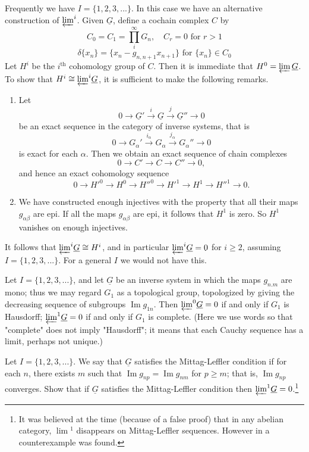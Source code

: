 \documentclass[../main]{subfiles}
\begin{document}
Frequently we have $I=\{1,2,3,...\}$. In this case we have an alternative construction of ${\varprojlim}^i$. Given $\underline{G}$, define a cochain complex $C$ by 
\[C_0=C_1=\prod_i^\infty G_n,\quad C_r=0 \text{ for } r>1 \] 
\[\delta\{x_n\}=\{x_n-g_{n,n+1}x_{n+1}\} \text{ for } \{x_n\}\in C_0\]
Let $H^i$ be the $i^\text{th}$ cohomology group of $C$. Then it is immediate that $H^0=\varprojlim\underline{G}$. To show that $H^i\cong{\varprojlim}^i\underline{G}$, it is sufficient to make the following remarks.
\begin{enumerate}[wide=\parindent]
    \item Let \[0\longrightarrow \underline{G}'\overset{i}{\longrightarrow}\underline{G}\overset{j}{\longrightarrow}\underline{G}''\longrightarrow 0\] be an exact sequence in the category of inverse systems, that is \\ \[0\longrightarrow G_\alpha'\overset{i_\alpha}{\longrightarrow}G_\alpha\overset{j_\alpha}{\longrightarrow}G_\alpha''\longrightarrow 0\] is exact for each $\alpha$. Then we obtain an exact sequence of chain complexes
    \[0\longrightarrow C'\longrightarrow C\longrightarrow C'' \longrightarrow 0,\]
    and hence an exact cohomology sequence
    \[0\longrightarrow {H'}^0\longrightarrow H^0\longrightarrow {H''}^0 \longrightarrow {H'}^1 \longrightarrow H^1 \longrightarrow {H''}^1 \longrightarrow 0.\]
    \item We have constructed enough injectives with the property that all their maps $g_{\alpha\beta}$ are epi. If all the maps $g_{\alpha\beta}$ are epi, it follows that $H^1$ is zero. So $H^1$ vanishes on enough injectives.
\end{enumerate}
\par It follows that ${\varprojlim}^i \underline{G}\cong H^i$, and in particular ${\varprojlim}^i\underline{G}=0$ for $i\geq 2$, assuming $I=\{1,2,3,...\}$. For a general $I$ we would not have this.
\begin{exercise} \label{ex:p3ch08.i}
Let $I=\{1,2,3,...\}$, and let $\underline{G}$ be an inverse system in which the maps $g_{n.m}$ are mono; thus we may regard $G_1$ as a topological group, topologized by giving the decreasing sequence of subgroups $\operatorname{Im}g_{1n}$. Then ${\varprojlim}^0\underline{G}=0$ if and only if $G_1$ is Hausdorff; ${\varprojlim}^1\underline{G}=0$ if and only if $G_1$ is complete. (Here we use words so that "complete" does not imply "Hausdorff"; it means that each Cauchy sequence has a limit, perhaps not unique.)
\end{exercise}
\begin{exercise} \label{ex:p3ch08.ii}
Let $I=\{1,2,3,...\}$. We say that $\underline{G}$ satisfies the Mittag-Leffler condition if for each $n$, there exists $m$ such that $\operatorname{Im}g_{np}=\operatorname{Im}g_{nm}$ for $p\geq m$; that is, $\operatorname{Im}g_{np}$ converges. Show that if $\underline{G}$ satisfies the Mittag-Leffler condition then ${\varprojlim}^1\underline{G}=0$.\footnote{It was believed at the time (because of a false proof) that in any abelian category, $\lim\!^1$ disappears on Mittag-Leffler sequences. However in \cite{Neeman} a counterexample was found.}
\end{exercise} 
\end{document}
